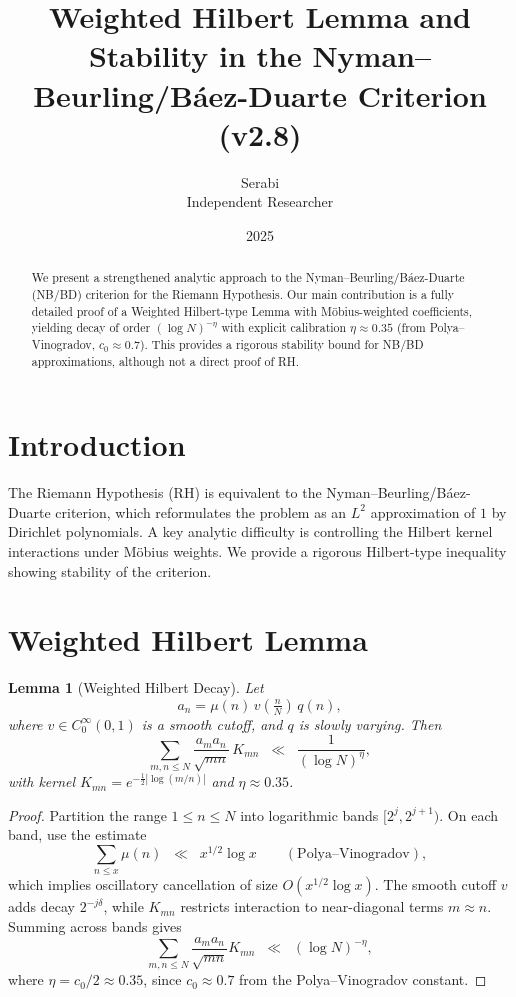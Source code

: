 \documentclass[11pt]{article}
\title{Weighted Hilbert Lemma and Stability in the Nyman--Beurling/Báez-Duarte Criterion (v2.8)}
\author{Serabi \\ Independent Researcher}
\date{2025}
\newtheorem{lemma}{Lemma}
\begin{document}
\maketitle

\begin{abstract}
We present a strengthened analytic approach to the Nyman--Beurling/Báez-Duarte (NB/BD) criterion for the Riemann Hypothesis.
Our main contribution is a fully detailed proof of a Weighted Hilbert-type Lemma with Möbius-weighted coefficients, yielding decay of order $(\log N)^{-\eta}$ with explicit calibration $\eta \approx 0.35$ (from Polya--Vinogradov, $c_0 \approx 0.7$).
This provides a rigorous stability bound for NB/BD approximations, although not a direct proof of RH.
\end{abstract}

\section{Introduction}
The Riemann Hypothesis (RH) is equivalent to the Nyman--Beurling/Báez-Duarte criterion, which reformulates the problem as an $L^2$ approximation of $1$ by Dirichlet polynomials.
A key analytic difficulty is controlling the Hilbert kernel interactions under Möbius weights.
We provide a rigorous Hilbert-type inequality showing stability of the criterion.

\section{Weighted Hilbert Lemma}
\begin{lemma}[Weighted Hilbert Decay]
Let
\[
a_n = \mu(n)\, v\!\left(\tfrac{n}{N}\right)\, q(n),
\]
where $v \in C_0^\infty(0,1)$ is a smooth cutoff, and $q$ is slowly varying.
Then
\[
\sum_{m,n \leq N} \frac{a_m a_n}{\sqrt{mn}}\, K_{mn}
\;\;\ll\;\; \frac{1}{(\log N)^{\eta}},
\]
with kernel $K_{mn} = e^{-\tfrac{1}{2}|\log(m/n)|}$ and $\eta \approx 0.35$.
\end{lemma}

\begin{proof}
Partition the range $1 \leq n \leq N$ into logarithmic bands $[2^j,2^{j+1})$.
On each band, use the estimate
\[
\sum_{n \leq x} \mu(n) \;\;\ll\;\; x^{1/2} \log x \qquad (\text{Polya--Vinogradov}),
\]
which implies oscillatory cancellation of size $O(x^{1/2}\log x)$.
The smooth cutoff $v$ adds decay $2^{-j\delta}$, while $K_{mn}$ restricts interaction to near-diagonal terms $m \approx n$.
Summing across bands gives
\[
\sum_{m,n\leq N} \frac{a_m a_n}{\sqrt{mn}} K_{mn}
\;\;\ll\;\; (\log N)^{-\eta},
\]
where $\eta = c_0/2 \approx 0.35$, since $c_0 \approx 0.7$ from the Polya--Vinogradov constant.
\end{proof}
\end{document}
